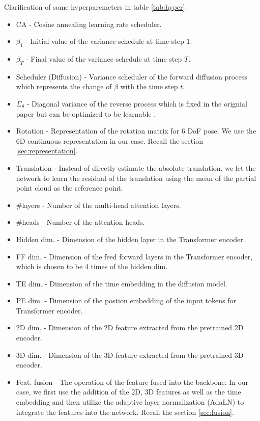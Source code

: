 \documentclass[12pt,DIV14,BCOR12mm,a4paper,footinclude=false,headinclude,parskip=half-,twoside,openright,cleardoublepage=empty,toc=index,bibliography=totoc,listof=totoc]{scrreprt}
\numberwithin{equation}{chapter}
\begin{document}
Clarification of some hyperparemeters in table \ref{tab:hyper}:
\begin{itemize}
  \item CA - Cosine annealing learning rate scheduler.
  \item $\beta_{1}$ - Initial value of the variance schedule at time step 1.
  \item $\beta_{T}$ - Final value of the variance schedule at time step $T$.
  \item Scheduler (Diffusion) - Variance scheduler of the forward diffusion process which represents the change of $\beta$ with the time step $t$.
  \item $\Sigma_{\theta}$ - Diagonal variance of the reverse process which is fixed in the orignial paper \cite{ho2020denoising} but can be optimized to be learnable \cite{nichol2021improved}.
  \item Rotation - Representation of the rotation matrix for 6 DoF pose. We use the 6D continuous representation in our case. Recall the section \ref{sec:representation}.
  \item Translation - Instead of directly estimate the absolute translation, we let the network to learn the residual of the translation using the mean of the partial point cloud as the reference point.
  \item \#layers - Number of the multi-head attention layers.
  \item \#heads - Number of the attention heads.
  \item Hidden dim. - Dimension of the hidden layer in the Transformer encoder.
  \item FF dim. - Dimension of the feed forward layers in the Transformer encoder, which is chosen to be 4 times of the hidden dim.
  \item TE dim. - Dimension of the time embedding in the diffusion model.
  \item PE dim. - Dimension of the postion embedding of the input tokens for Transformer encoder.
  \item 2D dim. - Dimension of the 2D feature extracted from the pretrained 2D encoder.
  \item 3D dim. - Dimension of the 3D feature extracted from the pretrained 3D encoder.
  \item Feat. fusion - The operation of the feature fused into the backbone. In our case, we first use the addition of the 2D, 3D features as well as the time embedding and then utilize the adaptive layer normalization (AdaLN) to integrate the features into the network. Recall the section \ref{sec:fusion}.
\end{itemize}
\end{document}
